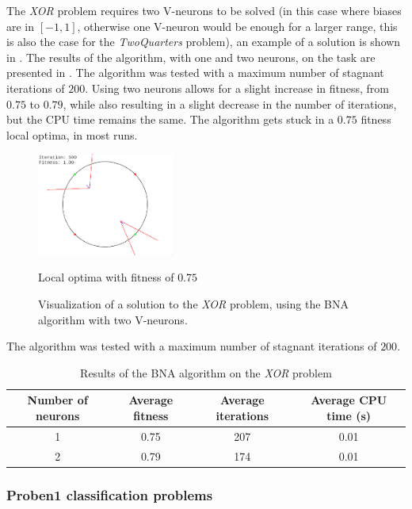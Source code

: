 The \textit{XOR} problem requires two V-neurons to be solved (in this case where biases are in $[-1, 1]$, otherwise one V-neuron would be enough for a larger range, this is also the case for the \textit{TwoQuarters}
problem), an example of a solution is shown in . The results of the algorithm, with one and two neurons, on the task are
presented in . The algorithm was tested with a maximum number of stagnant iterations of $200$. Using two neurons allows for a slight increase in fitness, from $0.75$ to $0.79$,
while also resulting in a slight decrease in the number of iterations, but the CPU time remains the same. The algorithm gets stuck in a $0.75$ fitness local optima, in most runs.

\begin{figure}
    \centering
        \centering
        \includegraphics[width=0.4\textwidth]{Pictures/bna-xor}
       \caption{Local optima with fitness of $0.75$}
    \caption{Visualization of a solution to the \textit{XOR} problem, using the BNA algorithm with two V-neurons.}
    \label{fig:bna_xor_visual}
\end{figure}

\begin{table}
    \caption{Results of the BNA algorithm on the \textit{XOR} problem}{The algorithm was tested with a maximum number of stagnant iterations of $200$.}
    \centering
    \label{tab:bna_xor}
    \begin{tabular}{ |c|c|c|c| }
        \hline
        Number of neurons & Average fitness & Average iterations & Average CPU time (s) \\
        \hline
        1 & 0.75 & 207 & 0.01 \\
        \hline
        2 & 0.79 & 174 & 0.01 \\
        \hline\hline
    \end{tabular}
\end{table}

\subsubsection{Proben1 classification problems}

